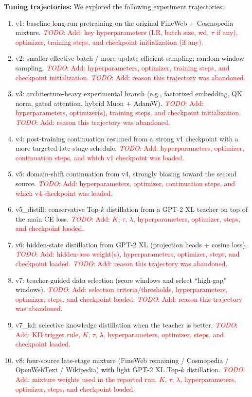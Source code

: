 \documentclass{article}
\renewcommand{\todo}[1]{\textcolor{red}{\emph{TODO}: #1}}
\begin{document}
\noindent\textbf{Tuning trajectories:} We explored the following experiment trajectories:
\begin{enumerate}
    \item v1: baseline long-run pretraining on the original FineWeb + Cosmopedia mixture. \todo{Add: key hyperparameters (LR, batch size, wd, $\tau$ if any), optimizer, training steps, and checkpoint initialization (if any).}
    \item v2: smaller effective batch / more update-efficient sampling; random window sampling. \todo{Add: hyperparameters, optimizer, training steps, and checkpoint initialization.} \todo{Add: reason this trajectory was abandoned.}
    \item v3: architecture-heavy experimental branch (e.g., factorized embedding, QK norm, gated attention, hybrid Muon + AdamW). \todo{Add: hyperparameters, optimizer(s), training steps, and checkpoint initialization.} \todo{Add: reason this trajectory was abandoned.}
    \item v4: post-training continuation resumed from a strong v1 checkpoint with a more targeted late-stage schedule. \todo{Add: hyperparameters, optimizer, continuation steps, and which v1 checkpoint was loaded.}
    \item v5: domain-shift continuation from v4, strongly biasing toward the second source. \todo{Add: hyperparameters, optimizer, continuation steps, and which v4 checkpoint was loaded.}
    \item v5\_distill: conservative Top-$k$ distillation from a GPT-2 XL teacher on top of the main CE loss. \todo{Add: $K$, $\tau$, $\lambda$, hyperparameters, optimizer, steps, and checkpoint loaded.}
    \item v6: hidden-state distillation from GPT-2 XL (projection heads + cosine loss). \todo{Add: hidden-loss weight(s), hyperparameters, optimizer, steps, and checkpoint loaded.} \todo{Add: reason this trajectory was abandoned.}
    \item v7: teacher-guided data selection (score windows and select ``high-gap'' windows). \todo{Add: selection criteria/thresholds, hyperparameters, optimizer, steps, and checkpoint loaded.} \todo{Add: reason this trajectory was abandoned.}
    \item v7\_kd: selective knowledge distillation when the teacher is better. \todo{Add: KD trigger rule, $K$, $\tau$, $\lambda$, hyperparameters, optimizer, steps, and checkpoint loaded.}
    \item v8: four-source late-stage mixture (FineWeb remaining / Cosmopedia / OpenWebText / Wikipedia) with light GPT-2 XL Top-$k$ distillation. \todo{Add: mixture weights used in the reported run, $K$, $\tau$, $\lambda$, hyperparameters, optimizer, steps, and checkpoint loaded.}

\end{enumerate}
\end{document}
